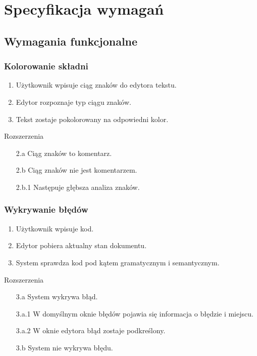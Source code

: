 \chapter{Specyfikacja wymagań}
\section{Wymagania funkcjonalne}
\subsection{Kolorowanie składni}
\begin{enumerate}
\item Użytkownik wpisuje ciąg znaków do edytora tekstu.
\item Edytor rozpoznaje typ ciągu znaków.
\item Tekst zostaje pokolorowany na odpowiedni kolor.
\end{enumerate}
Rozszerzenia
\begin{enumerate}
\item[2.a] Ciąg znaków to komentarz.
\item[2.b] Ciąg znaków nie jest komentarzem.
\item[2.b.1] Następuje głębsza analiza znaków.
\end{enumerate}
\subsection{Wykrywanie błędów}
\label{reqErrorDetection}
\begin{enumerate}
\item Użytkownik wpisuje kod.
\item Edytor pobiera aktualny stan dokumentu.
\item System sprawdza kod pod kątem gramatycznym i semantycznym.
\end{enumerate}
Rozszerzenia
\begin{enumerate}
\item[3.a] System wykrywa błąd. 
\item[3.a.1] W domyślnym oknie błędów pojawia się informacja o błędzie i miejscu.
\item[3.a.2] W oknie edytora błąd zostaje podkreślony.
\item[3.b] System nie wykrywa błędu.
\end{enumerate}
